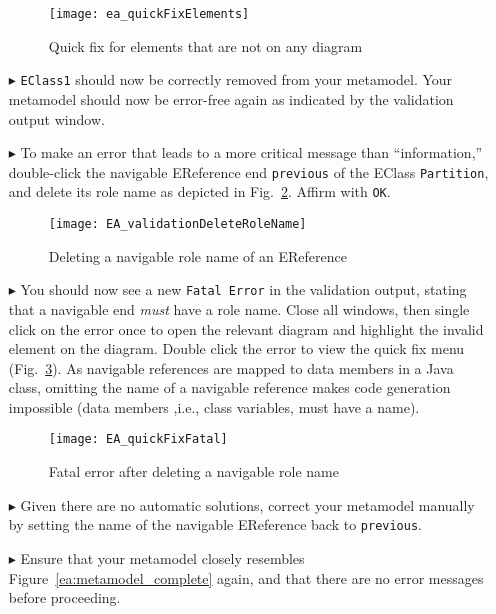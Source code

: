 \begin{enumerate}
\begin{figure}[htbp]
	\centering
  \texttt{[image: ea\_quickFixElements]}
	\caption{Quick fix for elements that are not on any diagram}
	\label{ea:quick-fix1}
\end{figure}
\FloatBarrier

\vspace{0.5cm}

\item[$\blacktriangleright$] \texttt{EClass1} should now be correctly removed from your metamodel. Your metamodel should now be error-free again as indicated by
the validation output window.

\item[$\blacktriangleright$] To make an error that leads to a more critical message than ``information,'' double-click the navigable EReference end
\texttt{previous} of the EClass \texttt{Partition}, and delete its role name as depicted in Fig.~\ref{ea:delete-role-name}. Affirm with \texttt{OK}.

\begin{figure}[htbp]
    \centering
  \texttt{[image: EA\_validationDeleteRoleName]}
    \caption{Deleting a navigable role name of an EReference}
    \label{ea:delete-role-name}
\end{figure}

\item[$\blacktriangleright$] You should now see a new \texttt{Fatal Error} in the validation output, stating that a navigable end \emph{must} have a role name.
Close all windows, then single click on the error once to open the relevant diagram and highlight the invalid element on the diagram. Double click the error to
view the quick fix menu (Fig.~\ref{ea:fatal-error}). As navigable references are mapped to data members in a Java class, omitting the name of a navigable
reference makes code generation impossible (data members ,i.e., class variables, must have a name).

\begin{figure}[htbp]
	\centering
  \texttt{[image: EA\_quickFixFatal]}
	\caption{Fatal error after deleting a navigable role name}
	\label{ea:fatal-error}
\end{figure}

\item[$\blacktriangleright$] Given there are no automatic solutions, correct your metamodel manually by setting the name of the navigable EReference back to
\texttt{previous}.

\item[$\blacktriangleright$] Ensure that your metamodel closely resembles Figure~\ref{ea:metamodel_complete} again, and that there are no error messages before
proceeding.

\end{enumerate}

